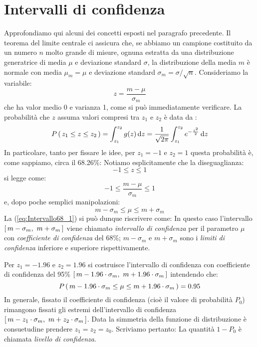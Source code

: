\section{Intervalli di confidenza}
\label{sec:IntervalliDiConfidenza}

Approfondiamo qui alcuni dei concetti esposti nel paragrafo precedente.
Il teorema del limite centrale ci assicura che, se abbiamo un campione
costituito da un numero $n$ molto grande di misure, ognuna estratta da una
distribuzione generatrice di media $\mu$ e deviazione standard $\sigma$,
la distribuzione della media $m$ \`e normale con media $\mu_m = \mu$ e
deviazione standard $\sigma_m = \sigma /\sqrt{n}$.
Consideriamo la variabile:
$$
z=\frac{m-\mu}{\sigma_m}
$$
che ha valor medio 0 e varianza 1, come si pu\`o immediatamente
verificare.
La probabilit\`a che $z$ assuma valori compresi tra $z_1$ e $z_2$ \`e data
da :
$$
\prob{z_1 \leq z \leq z_2} = \dintegral{g(z)}{z}{z_1}{z_2} =
\frac{1}{\sqrt{2\pi}} \dintegral{e^{-\frac{z^2}{2}}}{z}{z_1}{z_2}
$$
In particolare, tanto per fissare le idee, per $z_1=-1$ e $z_2=1$ questa
probabilit\`a \`e, come sappiamo, circa il 68.26\%:
Notiamo esplicitamente che la diseguaglianza:
$$
-1 \leq z \leq 1
$$
si legge come:
$$
-1 \leq \frac{m-\mu}{\sigma_m} \leq 1
$$
e, dopo poche semplici manipolazioni:
$$
m-\sigma_m \leq \mu \leq m+\sigma_m
$$
La (\ref{eq:Intervallo68_1}) si pu\`o dunque riscrivere come:
In questo caso l'intervallo $\cinterval{m-\sigma_m}{m+\sigma_m}$
viene chiamato \emph{intervallo di confidenza} per il parametro $\mu$ con
\emph{coefficiente di confidenza} del 68\%; $m-\sigma_m$ e $m+\sigma_m$
sono i \emph{limiti di confidenza} inferiore e superiore rispettivamente.

Per $z_1=-1.96$ e $z_2=1.96$ si costruisce l'intervallo di confidenza con
coefficiente di confidenza del 95\%
$\cinterval{m-1.96 \cdot \sigma_m}{m+1.96 \cdot \sigma_m}$
intendendo che:
$$
\prob{m-1.96 \cdot \sigma_m \leq \mu\leq m+1.96 \cdot \sigma_m} = 0.95
$$
In generale, fissato il coefficiente di confidenza (cio\`e il valore
di probabilit\`a $P_0$) rimangono fissati gli estremi dell'intervallo di
confidenza $\cinterval{m - z_1 \cdot \sigma_m}{m + z_2 \cdot \sigma_m}$.
Data la simmetria della funzione di distribuzione \`e consuetudine
prendere $z_1 = z_2 = z_0$.
Scriviamo pertanto:
La quantit\`a $1-P_0$ \`e chiamata {\itshape livello di confidenza}.


